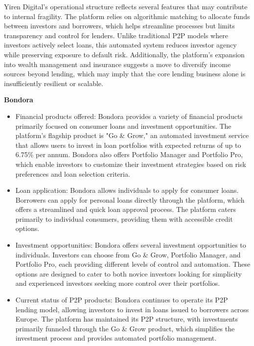 \documentclass[pdflatex,sn-apa]{sn-jnl}%
\theoremstyle{thmstyleone}%
\theoremstyle{thmstyletwo}%
\theoremstyle{thmstylethree}%
\begin{document}
Yiren Digital’s operational structure reflects several features that may contribute to internal fragility. The platform relies on algorithmic matching to allocate funds between investors and borrowers, which helps streamline processes but limits transparency and control for lenders. Unlike traditional P2P models where investors actively select loans, this automated system reduces investor agency while preserving exposure to default risk. Additionally, the platform’s expansion into wealth management and insurance suggests a move to diversify income sources beyond lending, which may imply that the core lending business alone is insufficiently resilient or scalable. 

\vspace{1\baselineskip}
\textbf{Bondora}
    \begin{itemize}
        \item Financial products offered: Bondora provides a variety of financial products primarily focused on consumer loans and investment opportunities. The platform's flagship product is "Go \& Grow," an automated investment service that allows users to invest in loan portfolios with expected returns of up to 6.75\% per annum. Bondora also offers Portfolio Manager and Portfolio Pro, which enable investors to customize their investment strategies based on risk preferences and loan selection criteria.
        
        \item Loan application: Bondora allows individuals to apply for consumer loans. Borrowers can apply for personal loans directly through the platform, which offers a streamlined and quick loan approval process. The platform caters primarily to individual consumers, providing them with accessible credit options.
        
        \item Investment opportunities: Bondora offers several investment opportunities to individuals. Investors can choose from Go \& Grow, Portfolio Manager, and Portfolio Pro, each providing different levels of control and automation. These options are designed to cater to both novice investors looking for simplicity and experienced investors seeking more control over their portfolios.
        
        \item Current status of P2P products: Bondora continues to operate its P2P lending model, allowing investors to invest in loans issued to borrowers across Europe. The platform has maintained its P2P structure, with investments primarily funneled through the Go \& Grow product, which simplifies the investment process and provides automated portfolio management.
        

\end{itemize}
\end{document}

